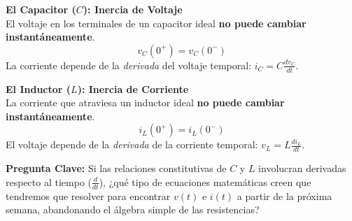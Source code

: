 \documentclass[11pt, a4paper]{article}
\begin{document}
\vspace{0.2cm}
\noindent\begin{minipage}{0.48\textwidth}
    \textbf{El Capacitor ($C$): Inercia de Voltaje} \\
    El voltaje en los terminales de un capacitor ideal \textbf{no puede cambiar instantáneamente}.
    \begin{equation*}
        v_C(0^+) = v_C(0^-)
    \end{equation*}
    La corriente depende de la \textit{derivada} del voltaje temporal: $i_C = C \frac{dv_C}{dt}$.
\end{minipage}
\hfill
\begin{minipage}{0.48\textwidth}
    \textbf{El Inductor ($L$): Inercia de Corriente} \\
    La corriente que atraviesa un inductor ideal \textbf{no puede cambiar instantáneamente}.
    \begin{equation*}
        i_L(0^+) = i_L(0^-)
    \end{equation*}
    El voltaje depende de la \textit{derivada} de la corriente temporal: $v_L = L \frac{di_L}{dt}$.
\end{minipage}

\vspace{0.5cm}
\begin{tcolorbox}[colback=gray!5, colframe=gray!50, title=\textbf{Reflexión Conceptual}]
\textbf{Pregunta Clave:} Si las relaciones constitutivas de $C$ y $L$ involucran derivadas respecto al tiempo ($\frac{d}{dt}$), ¿qué tipo de ecuaciones matemáticas creen que tendremos que resolver para encontrar $v(t)$ e $i(t)$ a partir de la próxima semana, abandonando el álgebra simple de las resistencias?
\end{tcolorbox}
\end{document}

